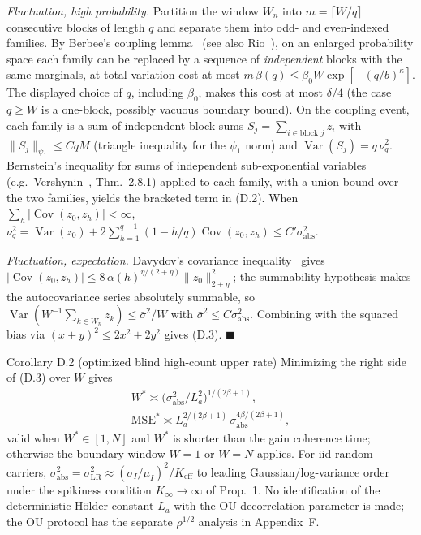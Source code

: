 \emph{Fluctuation, high probability.} Partition the window $W_n$ into $m=\lceil W/q\rceil$ consecutive blocks of length $q$ and separate them into odd- and even-indexed families. By Berbee's coupling lemma~\cite{Berbee1979} (see also Rio~\cite{Rio2017}), on an enlarged probability space each family can be replaced by a sequence of \emph{independent} blocks with the same marginals, at total-variation cost at most $m\,\beta(q)\le \beta_0W\exp[-(q/b)^{\kappa}]$. The displayed choice of $q$, including $\beta_0$, makes this cost at most $\delta/4$ (the case $q\ge W$ is a one-block, possibly vacuous boundary bound). On the coupling event, each family is a sum of independent block sums $S_j=\sum_{i\in\text{block }j}z_i$ with $\|S_j\|_{\psi_1}\le CqM$ (triangle inequality for the $\psi_1$ norm) and $\operatorname{Var}(S_j)=q\,\nu_q^2$. Bernstein's inequality for sums of independent sub-exponential variables (e.g.\ Vershynin~\cite{Vershynin2018}, Thm.~2.8.1) applied to each family, with a union bound over the two families, yields the bracketed term in (D.2). When $\sum_h|\operatorname{Cov}(z_0,z_h)|<\infty$, $\nu_q^2=\operatorname{Var}(z_0)+2\sum_{h=1}^{q-1}(1-h/q)\operatorname{Cov}(z_0,z_h)\le C'\sigma_{\mathrm{abs}}^2$.

\emph{Fluctuation, expectation.} Davydov's covariance inequality~\cite{Davydov1968} gives $|\operatorname{Cov}(z_0,z_h)|\le 8\,\alpha(h)^{\eta/(2+\eta)}\|z_0\|_{2+\eta}^2$; the summability hypothesis makes the autocovariance series absolutely summable, so $\operatorname{Var}(W^{-1}\sum_{k\in W_n}z_k)\le \bar\sigma^2/W$ with $\bar\sigma^2\le C\sigma_{\mathrm{abs}}^2$. Combining with the squared bias via $(x+y)^2\le2x^2+2y^2$ gives (D.3). \hfill$\blacksquare$

\begin{namedthm}{Corollary D.2 (optimized blind high-count upper rate)}
Minimizing the right side of (D.3) over $W$ gives
\begin{equation}
\begin{gathered}
W^{*}\asymp\big(\sigma_{\mathrm{abs}}^2/L_a^2\big)^{1/(2\beta+1)},\\
\mathrm{MSE}^{*}\asymp L_a^{2/(2\beta+1)}\,\sigma_{\mathrm{abs}}^{4\beta/(2\beta+1)},
\end{gathered}
\tag{D.4}
\end{equation}
valid when $W^{*}\in[1,N]$ and $W^{*}$ is shorter than the gain coherence time; otherwise the boundary window $W=1$ or $W=N$ applies. For iid random carriers, $\sigma_{\mathrm{abs}}^2=\sigma_{\mathrm{LR}}^2\approx(\sigma_I/\mu_I)^2/K_{\mathrm{eff}}$ to leading Gaussian/log-variance order under the spikiness condition $K_\infty\to\infty$ of Prop.~1. No identification of the deterministic H\"older constant $L_a$ with the OU decorrelation parameter is made; the OU protocol has the separate $\rho^{1/2}$ analysis in Appendix~F.
\end{namedthm}

